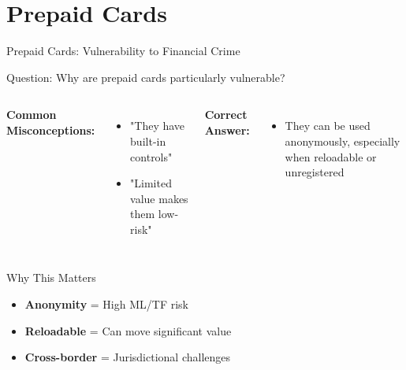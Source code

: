 \documentclass{beamer}
\begin{document}
\section{Prepaid Cards}
\begin{frame}{Prepaid Cards: Vulnerability to Financial Crime}
\begin{block}{Question: Why are prepaid cards particularly vulnerable?}
\end{block}

\vspace{0.3cm}
\begin{columns}
\textcolor{wrong}{\textbf{ Common Misconceptions:}}
\begin{itemize}
    \item "They have built-in controls"
    \item "Limited value makes them low-risk"
\end{itemize}

\textcolor{correct}{\textbf{Correct Answer:}}
\begin{itemize}
    \item They can be used anonymously, especially when reloadable or unregistered
\end{itemize}
\end{columns}

\begin{block}{Why This Matters}
\begin{itemize}
    \item \textbf{Anonymity} = High ML/TF risk
    \item \textbf{Reloadable} = Can move significant value
    \item \textbf{Cross-border} = Jurisdictional challenges
\end{itemize}
\end{block}
\end{frame}

\end{document}
